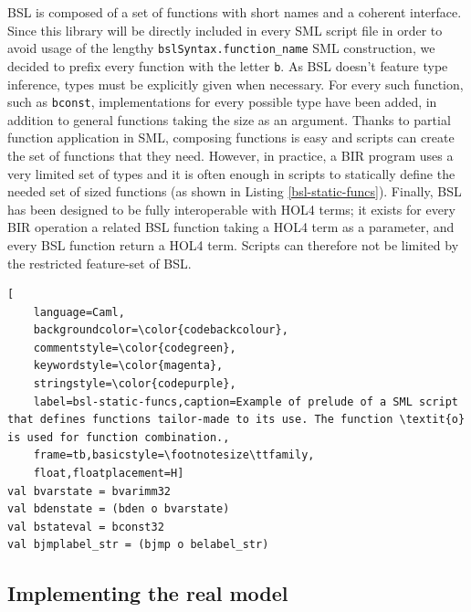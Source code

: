 \documentclass{kththesis}
\begin{document}
{BSL is composed of a set of functions with short names and a coherent interface. Since this library will be directly included in every \gls{SML} script file in order to avoid usage of the lengthy \texttt{bslSyntax.function\_name} SML construction, we decided to prefix every function with the letter \texttt{b}. As BSL doesn't feature type inference, types must be explicitly given when necessary. For every such function, such as \texttt{bconst}, implementations for every possible type have been added, in addition to general functions taking the size as an argument. Thanks to partial function application in SML, composing functions is easy and scripts can create the set of functions that they need. However, in practice, a BIR program uses a very limited set of types and it is often enough in scripts to statically define the needed set of sized functions (as shown in Listing \ref{bsl-static-funcs}). Finally, BSL has been designed to be fully interoperable with HOL4 terms; it exists for every BIR operation a related BSL function taking a HOL4 term as a parameter, and every BSL function return a HOL4 term. Scripts can therefore not be limited by the restricted feature-set of BSL.

\begin{lstlisting}[
    language=Caml,
    backgroundcolor=\color{codebackcolour},
    commentstyle=\color{codegreen},
    keywordstyle=\color{magenta},
    stringstyle=\color{codepurple},
    label=bsl-static-funcs,caption=Example of prelude of a SML script that defines functions tailor-made to its use. The function \textit{o} is used for function combination.,
    frame=tb,basicstyle=\footnotesize\ttfamily,
    float,floatplacement=H]
val bvarstate = bvarimm32
val bdenstate = (bden o bvarstate)
val bstateval = bconst32
val bjmplabel_str = (bjmp o belabel_str)
\end{lstlisting}


\subsection{Implementing the real model} \label{impl-real-model}

}
\end{document}
